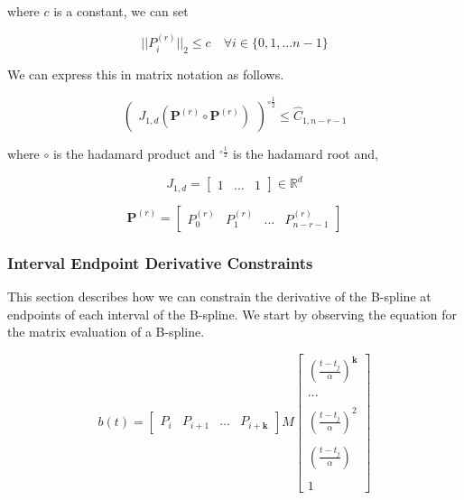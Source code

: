 \documentclass{article}
\begin{document}
where \(c\) is a constant, we can set

\begin{equation}
    ||P_i^{(r)}||_2 \leq c \quad \forall i \in \{0 , 1 , ... n-1\}
\end{equation}

We can express this in matrix notation as follows.

\begin{equation}
    \begin{pmatrix}J_{1,d}(\textbf{P}^{(r)} \circ \textbf{P}^{(r)})\end{pmatrix}^{\circ \frac{1}{2}} \leq \hat{C}_{1,n-r-1} 
\end{equation}

where \(\circ\) is the hadamard product and \(^{\circ \frac{1}{2}} \) is the hadamard root and, 

\begin{equation}
J_{1,d} = \begin{bmatrix}
    1 & ... & 1
    \end{bmatrix} \in \mathbb{R}^{d}
\end{equation}

\begin{equation}
    \textbf{P}^{(r)} = \begin{bmatrix}
    P_0^{(r)} & P_1^{(r)} & ... & P_{n-r-1}^{(r)}
    \end{bmatrix}
\end{equation}

\subsubsection{Interval Endpoint Derivative Constraints}

This section describes how we can constrain the derivative of the B-spline at endpoints of each interval of the B-spline. We start by observing the equation for the matrix evaluation of a B-spline.

\begin{equation}
    b(t) = \begin{bmatrix} P_{i} & P_{i+1} & ... & P_{i+\textbf{k}}\end{bmatrix} M \begin{bmatrix} (\frac{t-t_j}{\alpha})^\textbf{k} \\ \\ ... \\ \\ (\frac{t-t_j}{\alpha})^2 \\ \\ (\frac{t-t_j}{\alpha}) \\ \\ 1 \end{bmatrix}
\end{equation}
\end{document}
